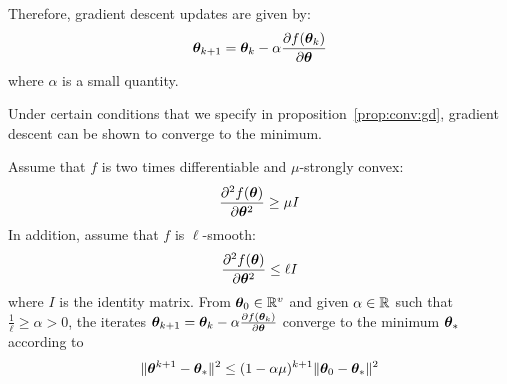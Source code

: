 Therefore, gradient descent updates are given by:
\begin{align}
  \thetab_{k+1} = \thetab_k -\alpha \partialfrac{\thetab}{f(\thetab_k)} \label{eq:update:gd}
\end{align}
where $\alpha$ is a small quantity.

Under certain conditions that we specify in proposition~\ref{prop:conv:gd},
gradient descent can be shown to converge to the minimum.

\begin{prop}
  \label{prop:conv:gd}
  Assume that $f$ is two times differentiable and $\mu$-strongly convex:
  \begin{equation}
    \partialfrac{\thetab^2}{^2f(\thetab)} \geq \mu I
  \end{equation}
  In addition, assume that $f$ is $\ell$-smooth:
  \begin{equation}
    \partialfrac{\thetab^2}{^2f(\thetab)} \leq \ell I
  \end{equation}
  where $I$ is the identity matrix.
  From $\thetab_0 \in \RR^v$ and given $\alpha \in \RR$ such that $\frac1{\ell} \geq \alpha > 0$, the iterates
  $\thetab_{k+1} = \thetab_k -\alpha \partialfrac{\thetab}{f(\thetab_k)}$ converge to the
  minimum $\thetab_*$ according to
  \begin{equation}
    \| \thetab^{k+1} - \thetab_* \|^2 \leq (1 - \alpha \mu)^{k + 1} \| \thetab_0 - \thetab_* \|^2
  \end{equation}
\end{prop}

